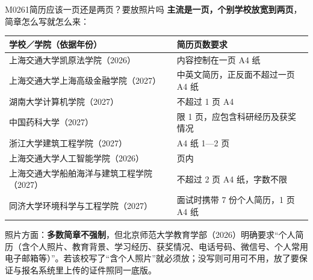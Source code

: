 \begin{qa}{M0261}{简历应该一页还是两页？要放照片吗}
\textbf{主流是一页，个别学校放宽到两页}，简章怎么写就怎么来：

\par\vspace{2pt}\nobreak\begin{center}\footnotesize
\begin{tabularx}{\textwidth}{>{\raggedright\arraybackslash}X>{\raggedright\arraybackslash}X}
\toprule
\textbf{学校／学院（依据年份）} & \textbf{简历页数要求} \\ \midrule
上海交通大学凯原法学院（2026） & 内容控制在一页 A4 纸 \\
上海交通大学上海高级金融学院（2027） & 中英文简历，正反面不超过一页 A4 纸 \\
湖南大学计算机学院（2027） & 不超过 1 页 A4 \\
中国药科大学（2027） & 限 1 页，应包含科研经历及获奖情况 \\
浙江大学建筑工程学院（2027） & A4 纸 1—2 页 \\
上海交通大学人工智能学院（2026） & 2 页内 \\
上海交通大学船舶海洋与建筑工程学院（2027） & 不超过 2 页 A4 纸，字数不限 \\
同济大学环境科学与工程学院（2027） & 面试时携带 7 份个人简历，1 页 A4 纸 \\
\bottomrule
\end{tabularx}
\end{center}\vspace{2pt}\par

照片方面：\textbf{多数简章不强制}，但北京师范大学教育学部（2026）明确要求“个人简历（含个人照片、教育背景、学习经历、获奖情况、电话号码、微信号、个人常用电子邮箱等）”。若该校写了“含个人照片”就必须放；没写则可用可不用，放了要保证与报名系统里上传的证件照同一底版。
\end{qa}

